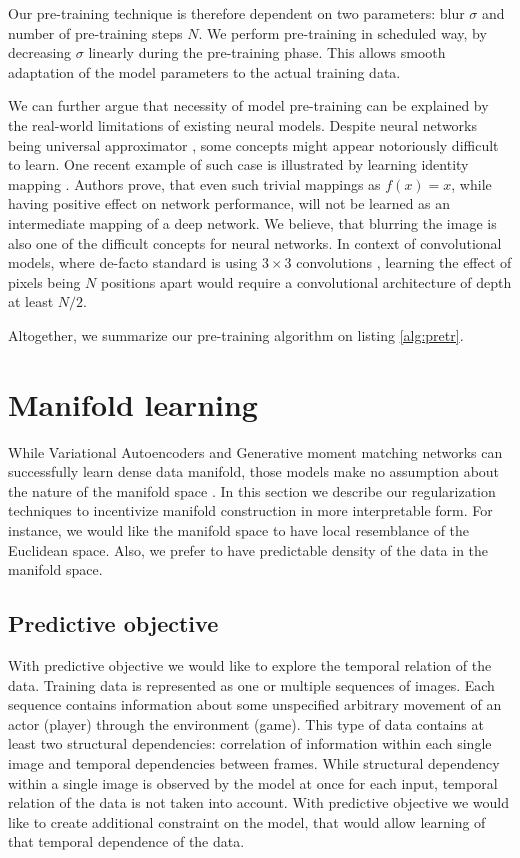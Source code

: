 Our pre-training technique is therefore dependent on two parameters: blur $\sigma$ and number of pre-training steps $N$.
We perform pre-training in scheduled way, by decreasing $\sigma$ linearly during the pre-training phase.
This allows smooth adaptation of the model parameters to the actual training data.

We can further argue that necessity of model pre-training can be explained by the real-world limitations of existing neural models.
Despite neural networks being universal approximator \cite{Debao1993}, some concepts might appear notoriously difficult to learn.
One recent example of such case is illustrated by learning identity mapping \cite{He2015}.
Authors prove, that even such trivial mappings as $f(x)=x$, while having positive effect on network performance, will not be learned as an intermediate mapping of a deep network.
We believe, that blurring the image is also one of the difficult concepts for neural networks.
In context of convolutional models, where de-facto standard is using $3 \times 3$ convolutions \cite{Szegedy2016a}, learning the effect of pixels being $N$ positions apart would require a convolutional architecture of depth at least $N/2$.

Altogether, we summarize our pre-training algorithm on listing \ref{alg:pretr}.



\section{Manifold learning}\label{ss:mf}

While Variational Autoencoders and Generative moment matching networks can successfully learn dense data manifold, those models make no assumption about the nature of the manifold space \cite{Li2015, Ren2016, Kingma2013}.
In this section we describe our regularization techniques to incentivize manifold construction in more interpretable form.
For instance, we would like the manifold space to have local resemblance of the Euclidean space.
Also, we prefer to have predictable density of the data in the manifold space.

\subsection{Predictive objective}

With predictive objective we would like to explore the temporal relation of the data.
Training data is represented as one or multiple sequences of images.
Each sequence contains information about some unspecified arbitrary movement of an actor (player) through the environment (game).
This type of data contains at least two structural dependencies: correlation of information within each single image and temporal dependencies between frames.
While structural dependency within a single image is observed by the model at once for each input, temporal relation of the data is not taken into account.
With predictive objective we would like to create additional constraint on the model, that would allow learning of that temporal dependence of the data.

